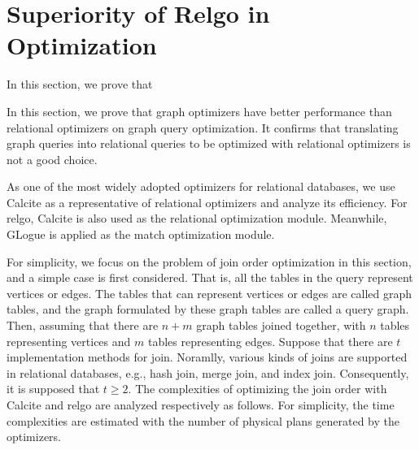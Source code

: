 \section{Superiority of Relgo in Optimization}
\label{sec:theoretical-analysis}

In this section, we prove that 

In this section, we prove that graph optimizers have better performance than relational optimizers on graph query optimization.
It confirms that translating graph queries into relational queries to be optimized with relational optimizers is not a good choice.

As one of the most widely adopted optimizers for relational databases, we use Calcite \cite{calcite,columbia} as a representative of relational optimizers and analyze its efficiency.
For relgo, Calcite is also used as the relational optimization module.
Meanwhile, GLogue \cite{GLogS} is applied as the match optimization module.

For simplicity, we focus on the problem of join order optimization in this section, and a simple case is first considered.
That is, all the tables in the query represent vertices or edges.
The tables that can represent vertices or edges are called graph tables, and the graph formulated by these graph tables are called a query graph.
Then, assuming that there are $n + m$ graph tables joined together, with $n$ tables representing vertices and $m$ tables representing edges.
Suppose that there are $t$ implementation methods for join.
Noramlly, various kinds of joins are supported in relational databases, e.g., hash join, merge join, and index join.
Consequently, it is supposed that $t \geq 2$.
The complexities of optimizing the join order with Calcite and relgo are analyzed respectively as follows.
For simplicity, the time complexities are estimated with the number of physical plans generated by the optimizers.


